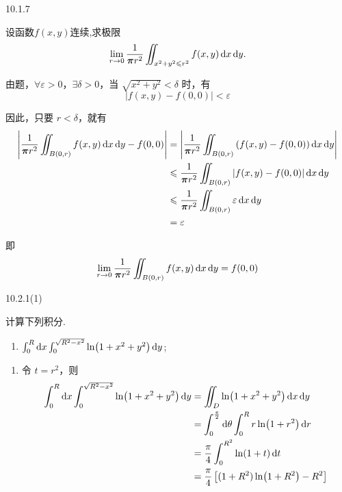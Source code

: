 \begin{exercise}
    {10.1.7}

    设函数$f(x,y)$连续,求极限
    $$
    \lim_{r \to 0} \frac{1}{\bm \pi r^2} \iint_{x^2+y^2 \leqslant r^2} f(x,y) \operatorname{d\!} x \operatorname{d\!} y.
    $$
\end{exercise}

\begin{solution}
    由题，$\forall \varepsilon > 0$，$\exists \delta > 0$，当 $\sqrt{x^2 + y^2} < \delta$ 时，有
\[
\left| f(x, y) - f(0,0) \right| < \varepsilon
\]

因此，只要 $r < \delta$，就有
\begin{align*}
\left| \frac{1}{\bm \pi r^2} \iint_{B(0,r)} f(x,y) \dif x \dif y - f(0,0) \right|
&= \left| \frac{1}{\bm \pi r^2} \iint_{B(0,r)} \left( f(x,y) - f(0,0) \right) \dif x \dif y \right| \\
&\les \frac{1}{\bm \pi r^2} \iint_{B(0,r)} \left| f(x,y) - f(0,0) \right| \dif x \dif y \\
&\les \frac{1}{\bm \pi r^2} \iint_{B(0,r)} \varepsilon \dif x \dif y \\
&= \varepsilon
\end{align*}

即
\[
\lim_{r \to 0} \frac{1}{\bm \pi r^2} \iint_{B(0,r)} f(x,y) \operatorname{d\!} x \operatorname{d\!} y = f(0,0)
\]
\end{solution}

\begin{exercise}
    {10.2.1(1)}

    计算下列积分.
    \begin{enumerate}
        \item $\int_0^R \operatorname{d\!} x \int_0^{\sqrt{R^2 - x^2}} \ln (1+x^2+y^2) \operatorname{d\!} y$;
    \end{enumerate}
\end{exercise}

\begin{solution}
    \begin{enumerate}
        \item 令 $t = r^2$，则
        \begin{align*}
        \int_0^R \operatorname{d\!} x \int_0^{\sqrt{R^2 - x^2}} \ln(1 + x^2 + y^2) \operatorname{d\!} y 
        &= \iint_D \ln(1 + x^2 + y^2) \operatorname{d\!} x \operatorname{d\!} y \\
        &= \int_0^{\frac{\pi}{2}} \operatorname{d\!} \theta \int_0^R r \ln(1 + r^2) \operatorname{d\!} r \\
        &= \frac{\pi}{4} \int_0^{R^2} \ln(1 + t) \operatorname{d\!} t \\
        &= \frac{\pi}{4} \left[ (1 + R^2)\ln(1 + R^2) - R^2 \right]
        \end{align*}
    \end{enumerate}
\end{solution}

